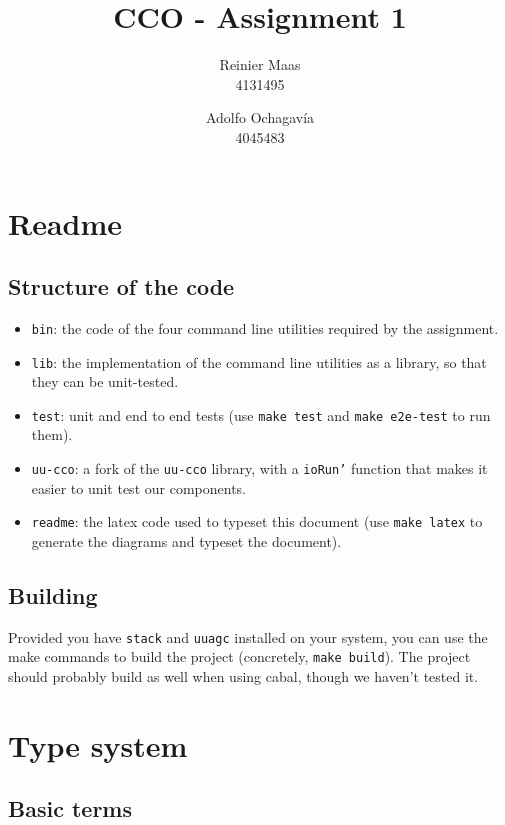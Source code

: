 \documentclass{article}
\author{
  Reinier Maas \\ 4131495
  \and
  Adolfo Ochagavía \\ 4045483
}
\title{CCO - Assignment 1}
\begin{document}
\maketitle


\section{Readme}

\subsection*{Structure of the code}

\begin{itemize}
\item \texttt{bin}: the code of the four command line utilities required by the assignment.
\item \texttt{lib}: the implementation of the command line utilities as a library, so that they can be unit-tested.
\item \texttt{test}: unit and end to end tests (use \texttt{make test} and \texttt{make e2e-test} to run them).
\item \texttt{uu-cco}: a fork of the \texttt{uu-cco} library, with a \texttt{ioRun'} function that makes it easier to unit test our components.
\item \texttt{readme}: the latex code used to typeset this document (use \texttt{make latex} to generate the diagrams and typeset the document).
\end{itemize}

\subsection*{Building}

Provided you have \texttt{stack} and \texttt{uuagc} installed on your system, you can use the make commands to build the project (concretely, \texttt{make build}). The project should probably build as well when using cabal, though we haven't tested it.

\section{Type system}

\subsection*{Basic terms}
\end{document}
